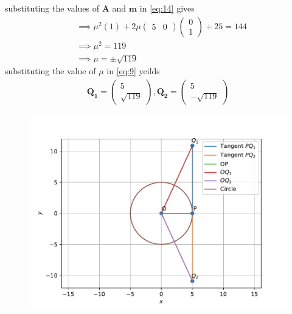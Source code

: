 \documentclass[12pt]{article}
\newcommand{\myvec}[1]{\ensuremath{\begin{pmatrix}#1\end{pmatrix}}}
\let\vec\mathbf
\begin{document}
\begin{enumerate}
		substituting the values of $\vec{A}$ and $\vec{m}$ in \eqref{eq:14} gives
\begin{align}
	&\implies\mu^2(1)+2\mu\myvec{5&0}\myvec{0\\1}+25=144\\
	&\implies\mu^2=119\\
	&\implies\mu=\pm\sqrt{119}
\end{align}
		substituting the value of $\mu$ in \eqref{eq:9} yeilds 
\begin{align}
\vec{Q_1}=\myvec{5\\\sqrt{119}},\vec{Q_2}=\myvec{5\\-\sqrt{119}}
\end{align}
\begin{figure}[!h]
\begin{center}
\includegraphics[width=\columnwidth]{figs/fig2.pdf}
\end{center}
\caption{}
\label{fig:Fig1}
\end{figure}
\end{enumerate}
\end{document}
